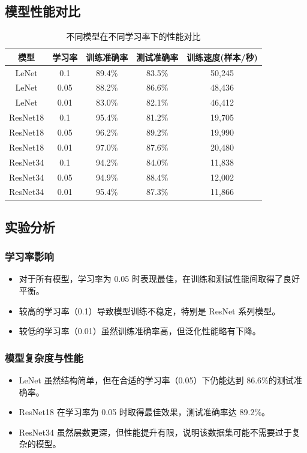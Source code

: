 \documentclass[UTF8]{ctexart}
\begin{document}
\subsection{模型性能对比}
\begin{table}[H]
    \centering
    \begin{tabular}{|c|c|c|c|c|}
        \hline
        模型 & 学习率 & 训练准确率 & 测试准确率 & 训练速度(样本/秒) \\
        \hline
        LeNet & 0.1 & 89.4\% & 83.5\% & 50,245 \\
        LeNet & 0.05 & 88.2\% & 86.6\% & 48,436 \\
        LeNet & 0.01 & 83.0\% & 82.1\% & 46,412 \\
        \hline
        ResNet18 & 0.1 & 95.4\% & 81.2\% & 19,705 \\
        ResNet18 & 0.05 & 96.2\% & 89.2\% & 19,990 \\
        ResNet18 & 0.01 & 97.0\% & 87.6\% & 20,480 \\
        \hline
        ResNet34 & 0.1 & 94.2\% & 84.0\% & 11,838 \\
        ResNet34 & 0.05 & 94.9\% & 88.4\% & 12,002 \\
        ResNet34 & 0.01 & 95.4\% & 87.3\% & 11,866 \\
        \hline
    \end{tabular}
    \caption{不同模型在不同学习率下的性能对比}
\end{table}

\subsection{实验分析}
\subsubsection{学习率影响}
\begin{itemize}
    \item 对于所有模型，学习率为 0.05 时表现最佳，在训练和测试性能间取得了良好平衡。
    \item 较高的学习率（0.1）导致模型训练不稳定，特别是 ResNet 系列模型。
    \item 较低的学习率（0.01）虽然训练准确率高，但泛化性能略有下降。
\end{itemize}

\subsubsection{模型复杂度与性能}
\begin{itemize}
    \item LeNet 虽然结构简单，但在合适的学习率（0.05）下仍能达到 86.6\%的测试准确率。
    \item ResNet18 在学习率为 0.05 时取得最佳效果，测试准确率达 89.2\%。
    \item ResNet34 虽然层数更深，但性能提升有限，说明该数据集可能不需要过于复杂的模型。
\end{itemize}
\end{document}
